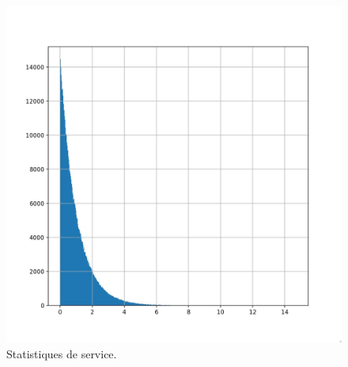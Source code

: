             \begin{figure}
                \centering
                \includegraphics[width=\textwidth]{images/statistiques_de_service.jpg}
                \caption{Statistiques de service.}
                \label{fig:statistiques_de_service}
            \end{figure}
